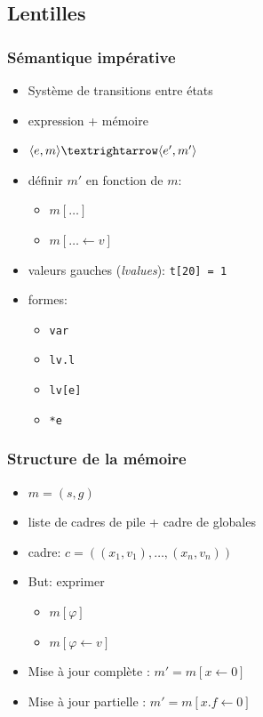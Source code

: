 \documentclass{beamer}
\begin{document}
\subsection{Lentilles}

\begin{frame}
\frametitle{Sémantique impérative}

\begin{itemize}
\item
  Système de transitions entre états
\item
  expression + mémoire
\item
  $\mm{m}{e}{m'}{e'}$
\item
  définir $m'$ en fonction de $m$:

  \begin{itemize}
  \item $m[…]$
  \item $m[… ← v]$
  \end{itemize}
\end{itemize}

\end{frame}

\begin{frame}
    \begin{itemize}
        \item valeurs gauches (\emph{lvalues}): \texttt{t[20] = 1}
        \item formes:
            \begin{itemize}
                \item \texttt{var}
                \item \texttt{lv.l}
                \item \texttt{lv[e]}
                \item \texttt{*e}
            \end{itemize}
    \end{itemize}
\end{frame}

\begin{frame}
\frametitle{Structure de la mémoire}

\begin{itemize}
\item $m = (s, g)$
\item liste de cadres de pile + cadre de globales
\item cadre: $c = ((x_1, v_1), …, (x_n, v_n))$
\item But: exprimer

  \begin{itemize}
  \item $m[φ]$
  \item $m[φ←v]$
  \end{itemize}
\item Mise à jour complète : $m' = m[ x ← 0]$
\item Mise à jour partielle : $m' = m[x.f ← 0]$
\end{itemize}
\end{frame}
\end{document}

